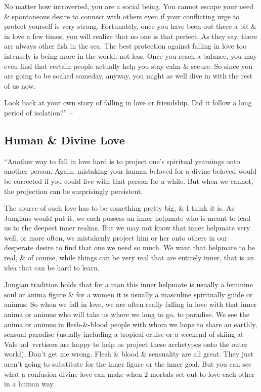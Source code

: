 \documentclass{article}
\numberwithin{equation}{section}
\begin{document}
No matter how introverted, you are a social being. You cannot escape your need \& spontaneous desire to connect with others even if your conflicting urge to protect yourself is very strong. Fortunately, once you have been out there a bit \& in love a few times, you will realize that no one is that perfect. As they say, there are always other fish in the sea. The best protection against falling in love too intensely is being more in the world, not less. Once you reach a balance, you may even find that certain people actually help you stay calm \& secure. So since you are going to be soaked someday, anyway, you might as well dive in with the rest of us now.

Look back at your own story of falling in love or friendship. Did it follow a long period of isolation?'' -- \cite[pp. 172--173]{Aron2013}

\subsection{Human \& Divine Love}
``Another way to fall in love hard is to project one's spiritual yearnings onto another person. Again, mistaking your human beloved for a divine beloved would be corrected if you could live with that person for a while. But when we cannot, the projection can be surprisingly persistent.

The source of such love has to be something pretty big, \& I think it is. As Jungians would put it, we each possess an inner helpmate who is meant to lead us to the deepest inner realms. But we may not know that inner helpmate very well, or more often, we mistakenly project him or her onto others in our desperate desire to find that one we need so much. We want that helpmate to be real, \& of course, while things can be very real that are entirely inner, that is an idea that can be hard to learn.

Jungian tradition holds that for a man this inner helpmate is usually a feminine soul or anima figure \& for a women it is usually a masculine spiritually guide or animus. So when we fall in love, we are often really falling in love with that inner anima or animus who will take us where we long to go, to paradise. We see the anima or animus in flesh-\&-blood people with whom we hope to share an earthly, sensual paradise (usually including a tropical cruise or a weekend of skiing at Vale--ad--vertisers are happy to help us project these archetypes onto the outer world). Don't get me wrong. Flesh \& blood \& sensuality are all great. They just aren't going to substitute for the inner figure or the inner goal. But you can see what a confusion divine love can make when 2 mortals set out to love each other in a human way.
\end{document}
